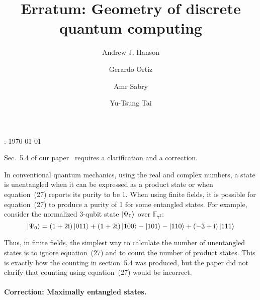 \documentclass{iopart}
\newcommand{\ff}[1]{\mathbb{F}_{#1}}
\begin{document}
\title{Erratum: Geometry of discrete quantum computing}


\author{Andrew J. Hanson}


\address{School of Informatics and Computing, Indiana University, Bloomington,
IN 47405, U.S.A}


\author{Gerardo Ortiz}


\address{Department of Physics, Indiana University, Bloomington, IN 47405,
U.S.A}


\author{Amr Sabry}


\address{School of Informatics and Computing, Indiana University, Bloomington,
IN 47405, U.S.A}


\author{Yu-Tsung Tai}


\address{Department of Mathematics, Indiana University, Bloomington, IN 47405,
U.S.A}


\address{School of Informatics and Computing, Indiana University, Bloomington,
IN 47405, U.S.A}


: {\today}

\maketitle

\noindent Sec.~5.4 of our paper~\cite{geometry} requires a clarification and a correction. 

In conventional quantum mechanics, using the real and complex numbers,
a state is unentangled when it can be expressed as a product state
or when equation~(27) reports its purity to be 1. When using finite
fields, it is possible for equation~(27) to produce a purity of 1
for some entangled states. For example, consider the normalized 3-qubit
state $\ket{\Psi_{0}}$ over $\ff{7^{2}}$: 
\[
\ket{\Psi_{0}}=\left(1+2\mathrm{i}\right)\ket{011}+\left(1+2\mathrm{i}\right)\ket{100}-\ket{101}-\ket{110}+\left(-3+\mathrm{i}\right)\ket{111}
\]


Thus, in finite fields, the simplest way to calculate the number of
unentangled states is to ignore equation~(27) and to count the number
of product states. This is exactly how the counting in section~5.4
was produced, but the paper did not clarify that counting using equation~(27)
would be incorrect.


\paragraph*{Correction: Maximally entangled states.}
\end{document}
